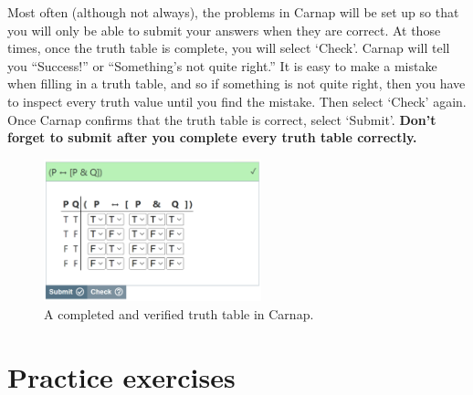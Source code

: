 Most often (although not always), the problems in Carnap will be set up so that you will only be able to submit your answers when they are correct. At those times, once the truth table is complete, you will select `Check'. Carnap will tell you ``Success!'' or ``Something's not quite right.'' It is easy to make a mistake when filling in a truth table, and so if something is not quite right, then you have to inspect every truth value until you find the mistake. Then select `Check' again. Once Carnap confirms that the truth table is correct, select `Submit'. \textbf{Don't forget to submit after you complete every truth table correctly.}


\begin{figure}%
\centering
\includegraphics[width=6.3cm]{tt-6a.png}
\caption{A completed and verified truth table in Carnap.}
\label{fig:tt-6}
\end{figure}	%







\section{Practice exercises}\label{pr.TT.TTorC}
\setcounter{ProbPart}{0}

